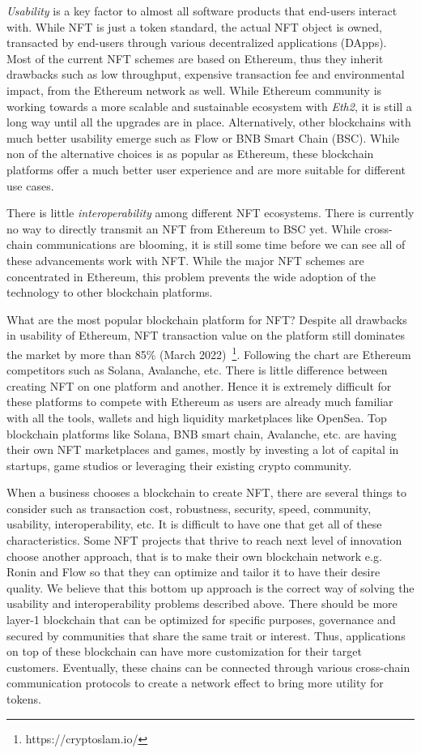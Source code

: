 \documentclass[11pt, titlepage]{article}
\begin{document}
\emph{Usability} is a key factor to almost all software products that end-users interact with. While NFT is just a token standard, the actual NFT object is owned, transacted by end-users through various decentralized applications (DApps). Most of the current NFT schemes are based on Ethereum, thus they inherit drawbacks such as low throughput, expensive transaction fee and environmental impact, from the Ethereum network as well. While Ethereum community is working towards a more scalable and sustainable ecosystem with \emph{Eth2}, it is still a long way until all the upgrades are in place. Alternatively, other blockchains with much better usability emerge such as Flow or BNB Smart Chain (BSC). While non of the alternative choices is as popular as Ethereum, these blockchain platforms offer a much better user experience and are more suitable for different use cases. 

There is little \emph{interoperability} among different NFT ecosystems. There is currently no way to directly transmit an NFT from Ethereum to BSC yet. While cross-chain communications are blooming, it is still some time before we can see all of these advancements work with NFT. While the major NFT schemes are concentrated in Ethereum, this problem prevents the wide adoption of the technology to other blockchain platforms.

What are the most popular blockchain platform for NFT? Despite all drawbacks in usability of Ethereum, NFT transaction value on the platform still dominates the market by more than 85\% (March 2022)~\footnote{https://cryptoslam.io/}. Following the chart are Ethereum competitors such as Solana, Avalanche, etc. There is little difference between creating NFT on one platform and another. Hence it is extremely difficult for these platforms to compete with Ethereum as users are already much familiar with all the tools, wallets and high liquidity marketplaces like OpenSea. Top blockchain platforms like Solana, BNB smart chain, Avalanche, etc. are having their own NFT marketplaces and games, mostly by investing a lot of capital in startups, game studios or leveraging their existing crypto community.

When a business chooses a blockchain to create NFT, there are several things to consider such as transaction cost, robustness, security, speed, community, usability, interoperability, etc. It is difficult to have one that get all of these characteristics. Some NFT projects that thrive to reach next level of innovation choose another approach, that is to make their own blockchain network e.g. Ronin and Flow so that they can optimize and tailor it to have their desire quality. We believe that this bottom up approach is the correct way of solving the usability and interoperability problems described above. There should be more layer-1 blockchain that can be optimized for specific purposes, governance and secured by communities that share the same trait or interest. Thus, applications on top of these blockchain can have more customization for their target customers. Eventually, these chains can be connected through various cross-chain communication protocols to create a network effect to bring more utility for tokens.
\end{document}
